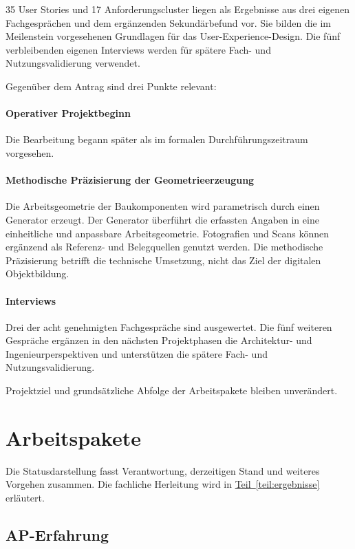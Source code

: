 \documentclass[type=zwischenbericht]{zukunftbau}
\begin{document}
35 User Stories und 17 Anforderungscluster liegen als Ergebnisse aus drei eigenen Fachgesprächen und dem ergänzenden Sekundärbefund vor. Sie bilden die im Meilenstein vorgesehenen Grundlagen für das User-Experience-Design. Die fünf verbleibenden eigenen Interviews werden für spätere Fach- und Nutzungsvalidierung verwendet.

Gegenüber dem Antrag sind drei Punkte relevant:

\paragraph{Operativer Projektbeginn}
Die Bearbeitung begann später als im formalen Durchführungszeitraum vorgesehen.

\paragraph{Methodische Präzisierung der Geometrieerzeugung}
Die Arbeitsgeometrie der Baukomponenten wird parametrisch durch einen Generator erzeugt. Der Generator überführt die erfassten Angaben in eine einheitliche und anpassbare Arbeitsgeometrie. Fotografien und Scans können ergänzend als Referenz- und Belegquellen genutzt werden. Die methodische Präzisierung betrifft die technische Umsetzung, nicht das Ziel der digitalen Objektbildung.

\paragraph{Interviews}
Drei der acht genehmigten Fachgespräche sind ausgewertet. Die fünf weiteren Gespräche ergänzen in den nächsten Projektphasen die Architektur- und Ingenieurperspektiven und unterstützen die spätere Fach- und Nutzungsvalidierung.

Projektziel und grundsätzliche Abfolge der Arbeitspakete bleiben unverändert.

\section{Arbeitspakete}

Die Statusdarstellung fasst Verantwortung, derzeitigen Stand und weiteres Vorgehen zusammen. Die fachliche Herleitung wird in \hyperref[teil:ergebnisse]{Teil~\ref*{teil:ergebnisse}} erläutert.

\subsection{AP-Erfahrung}
\end{document}
